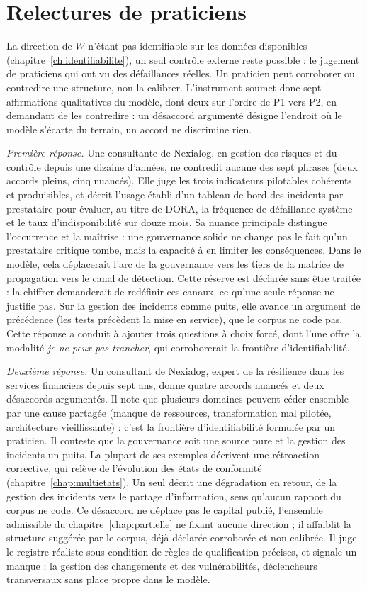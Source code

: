 \section{Relectures de praticiens}
\label{sec:relecture-praticien}

La direction de $W$ n'étant pas identifiable sur les données disponibles
(chapitre~\ref{ch:identifiabilite}), un seul contrôle externe reste possible : le jugement de
praticiens qui ont vu des défaillances réelles. Un praticien peut corroborer ou contredire une
structure, non la calibrer. L'instrument soumet donc sept affirmations qualitatives du modèle, dont
deux sur l'ordre de P1 vers P2, en demandant de les contredire : un désaccord argumenté désigne
l'endroit où le modèle s'écarte du terrain, un accord ne discrimine rien.

\emph{Première réponse.} Une consultante de Nexialog, en gestion des risques et du contrôle depuis
une dizaine d'années, ne contredit aucune des sept phrases (deux accords pleins, cinq nuancés). Elle
juge les trois indicateurs pilotables cohérents et produisibles, et décrit l'usage établi d'un
tableau de bord des incidents par prestataire pour évaluer, au titre de DORA, la fréquence de
défaillance système et le taux d'indisponibilité sur douze mois. Sa nuance principale distingue
l'occurrence et la maîtrise : une gouvernance solide ne change pas le fait qu'un prestataire critique
tombe, mais la capacité à en limiter les conséquences. Dans le modèle, cela déplacerait l'arc de la
gouvernance vers les tiers de la matrice de propagation vers le canal de détection. Cette réserve est
déclarée sans être traitée : la chiffrer demanderait de redéfinir ces canaux, ce qu'une seule réponse ne justifie pas. Sur la gestion des incidents comme
puits, elle avance un argument de précédence (les tests précèdent la mise en service), que le corpus
ne code pas. Cette réponse a conduit à ajouter trois questions à choix forcé, dont l'une offre la
modalité \emph{je ne peux pas trancher}, qui corroborerait la frontière d'identifiabilité.

\emph{Deuxième réponse.} Un consultant de Nexialog, expert de la résilience dans les services
financiers depuis sept ans, donne quatre accords nuancés et deux désaccords argumentés. Il note que
plusieurs domaines peuvent céder ensemble par une cause partagée (manque de ressources,
transformation mal pilotée, architecture vieillissante) : c'est la frontière d'identifiabilité
formulée par un praticien. Il conteste que la gouvernance soit une source pure et la gestion des
incidents un puits. La plupart de ses exemples décrivent une rétroaction corrective, qui relève de
l'évolution des états de conformité (chapitre~\ref{chap:multietats}). Un seul décrit une dégradation
en retour, de la gestion des incidents vers le partage d'information, sens qu'aucun rapport du corpus
ne code. Ce désaccord ne déplace pas le capital publié, l'ensemble admissible du
chapitre~\ref{chap:partielle} ne fixant aucune direction ; il affaiblit la structure suggérée par le
corpus, déjà déclarée corroborée et non calibrée. Il juge le registre réaliste sous condition de règles
de qualification précises, et signale un manque : la gestion des changements et des vulnérabilités,
déclencheurs transversaux sans place propre dans le modèle.

